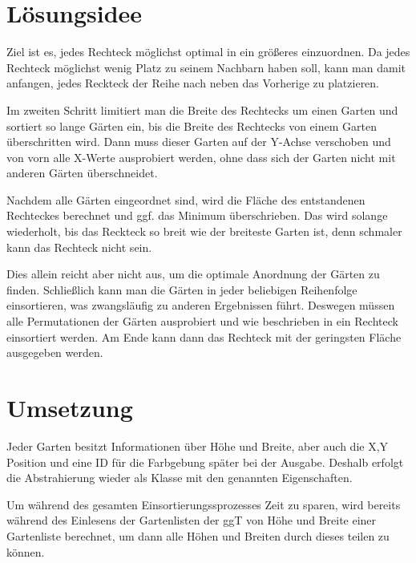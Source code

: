 \documentclass[a4paper,10pt,ngerman]{scrartcl}
\title{\Aufgabe}
\author{\Name\\Team-ID: \TeamId}
\date{\today}
\begin{document}
\maketitle
\vspace{7\baselineskip}
\tableofcontents
\pagebreak

\section{Lösungsidee}
\vspace{1\baselineskip}
Ziel ist es, jedes Rechteck möglichst optimal in ein größeres einzuordnen. Da jedes Rechteck möglichst wenig Platz zu seinem Nachbarn haben soll, kann man damit anfangen, jedes Reckteck der Reihe nach neben das Vorherige zu platzieren.

Im zweiten Schritt limitiert man die Breite des Rechtecks um einen Garten und sortiert so lange Gärten ein, bis die Breite des Rechtecks von einem Garten überschritten wird. Dann muss dieser Garten auf der Y-Achse verschoben und von vorn alle X-Werte ausprobiert werden, ohne dass sich der Garten nicht mit anderen Gärten überschneidet.

Nachdem alle Gärten eingeordnet sind, wird die Fläche des entstandenen Rechteckes berechnet und ggf. das Minimum überschrieben. Das wird solange wiederholt, bis das Reckteck so breit wie der breiteste Garten ist, denn schmaler kann das Rechteck nicht sein.

Dies allein reicht aber nicht aus, um die optimale Anordnung der Gärten zu finden. Schließlich kann man die Gärten in jeder beliebigen Reihenfolge einsortieren, was zwangsläufig zu anderen Ergebnissen führt. Deswegen müssen alle Permutationen der Gärten ausprobiert und wie beschrieben in ein Rechteck einsortiert werden. Am Ende kann dann das Rechteck mit der geringsten Fläche ausgegeben werden.


\pagebreak
\section{Umsetzung}

Jeder Garten besitzt Informationen über Höhe und Breite, aber auch die X,Y Position und eine ID für die Farbgebung später bei der Ausgabe. Deshalb erfolgt die Abstrahierung wieder als Klasse mit den genannten Eigenschaften.

Um während des gesamten Einsortierungssprozesses Zeit zu sparen, wird bereits während des Einlesens der Gartenlisten der ggT von Höhe und Breite einer Gartenliste berechnet, um dann alle Höhen und Breiten durch dieses teilen zu können.
\end{document}
